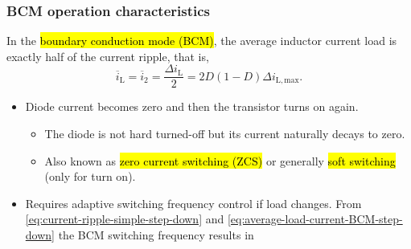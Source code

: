 \begin{frame}
	\frametitle{BCM operation characteristics}
	In the \hl{boundary conduction mode (BCM)}, the average inductor current load is exactly half of the current ripple, that is,
	\begin{equation}
		\overline{i}_\mathrm{L}=\overline{i}_2=\frac{\Delta i_\mathrm{L}}{2}= 2D(1-D)\Delta i_\mathrm{L,max}.
		\label{eq:average-load-current-BCM-step-down}
	\end{equation}
	\pause
	\vspace{-0.5cm}
	\begin{itemize}
		\item<2-> Diode current becomes zero and then the transistor turns on again.
		      \begin{itemize}
			      \item The diode is not hard turned-off but its current naturally decays to zero.
			      \item Also known as \hl{zero current switching (ZCS)} or generally \hl{soft switching} (only for turn on).
		      \end{itemize}
		\item<3-> Requires adaptive switching frequency control if load changes. From \eqref{eq:current-ripple-simple-step-down} and \eqref{eq:average-load-current-BCM-step-down} the BCM switching frequency results in
	\end{itemize}
\end{frame}

